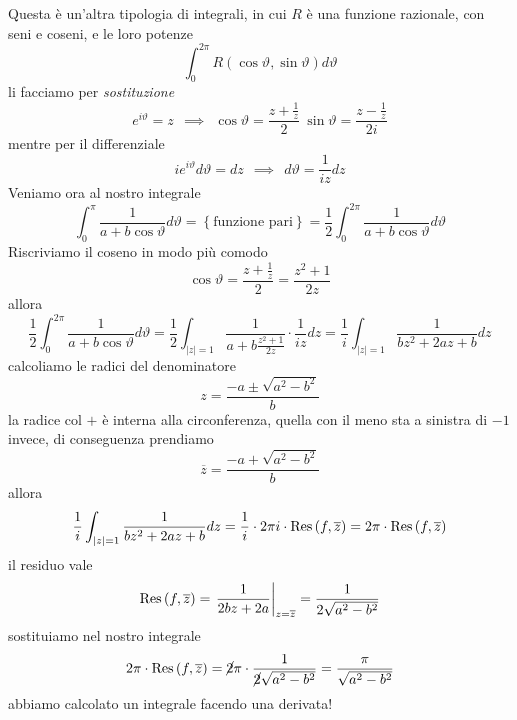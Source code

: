Questa è un'altra tipologia di integrali, in cui $R$ è una funzione razionale, con seni e coseni, e le loro potenze
\begin{equation*}
\int ^{2\pi }_{0} R\left(\cos \vartheta ,\sin \vartheta \right) d\vartheta 
\end{equation*}
li facciamo per \textit{sostituzione}
\begin{equation*}
\boxed{e^{i\vartheta } = z} \ \ \implies \ \ \boxed{\cos \vartheta = \frac{z + \frac{1}{z}}{2}} \ \boxed{\sin \vartheta = \frac{z - \frac{1}{z}}{2i}}
\end{equation*}
mentre per il differenziale
\begin{equation*}
ie^{i\vartheta } d\vartheta = dz\ \ \implies \ \ \boxed{d\vartheta = \frac{1}{iz} dz}
\end{equation*}
Veniamo ora al nostro integrale
\begin{equation*}
\int ^{\pi }_{0}\frac{1}{a + b\cos \vartheta } d\vartheta = \left\{\text{funzione pari}\right\} = \frac{1}{2}\int ^{2\pi }_{0}\frac{1}{a + b\cos \vartheta } d\vartheta 
\end{equation*}
Riscriviamo il coseno in modo più comodo
\begin{equation*}
\cos \vartheta = \frac{z + \frac{1}{z}}{2} = \frac{z^{2} + 1}{2z}
\end{equation*}
allora
\begin{equation*}
\frac{1}{2}\int ^{2\pi }_{0}\frac{1}{a + b\cos \vartheta } d\vartheta = \frac{1}{2}\int _{\left| z\right| = 1}\frac{1}{a + b\frac{z^{2} + 1}{2z}} \cdot \frac{1}{iz} dz = \frac{1}{i}\int _{\left| z\right| = 1}\frac{1}{bz^{2} + 2az + b} dz
\end{equation*}
calcoliamo le radici del denominatore
\begin{equation*}
z = \frac{ - a\pm \sqrt{a^{2} - b^{2}}}{b}
\end{equation*}
la radice col $ + $ è interna alla circonferenza, quella con il meno sta a sinistra di $ - 1$ invece, di conseguenza prendiamo
\begin{equation*}
\overline{z} = \frac{ - a + \sqrt{a^{2} - b^{2}}}{b}
\end{equation*}
allora
\begin{equation*}
\frac{1}{i}\int _{\left| z\right| = 1}\frac{1}{bz^{2} + 2az + b} dz = \frac{1}{i} \cdot 2\pi i\cdot \operatorname{Res} \left(f,\overline{z}\right) = 2\pi \cdot \operatorname{Res} \left(f,\overline{z}\right)
\end{equation*}
il residuo vale
\begin{equation*}
\operatorname{Res} \left(f,\overline{z}\right) = \left. \frac{1}{2bz + 2a}\right| _{z = \overline{z}} = \frac{1}{2\sqrt{a^{2} - b^{2}}}
\end{equation*}
sostituiamo nel nostro integrale
\begin{equation*}
2\pi \cdot \operatorname{Res} \left(f,\overline{z}\right) = \cancel{2} \pi \cdot \frac{1}{\cancel{2}\sqrt{a^{2} - b^{2}}} = \frac{\pi }{\sqrt{a^{2} - b^{2}}}
\end{equation*}
abbiamo calcolato un integrale facendo una derivata!
\Soluzione

